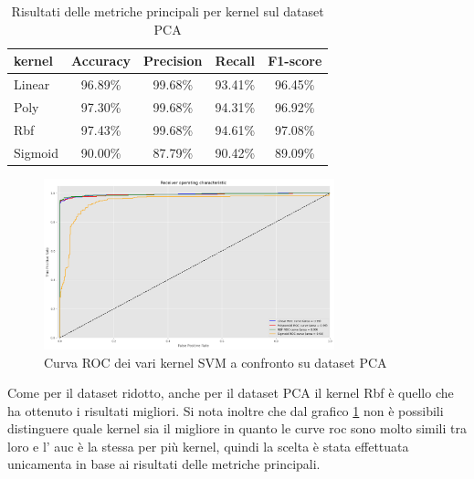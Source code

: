 \begin{table}[!ht]
    \centering
    \begin{tabular}{@{}lcccc@{}}
        \toprule
        \rowcolor[HTML]{EFEFEF}
        \textbf{kernel}                                                &
        \multicolumn{1}{l}{\cellcolor[HTML]{EFEFEF}\textbf{Accuracy}}  &
        \multicolumn{1}{l}{\cellcolor[HTML]{EFEFEF}\textbf{Precision}} &
        \multicolumn{1}{l}{\cellcolor[HTML]{EFEFEF}\textbf{Recall}}    &
        \multicolumn{1}{l}{\cellcolor[HTML]{EFEFEF}\textbf{F1-score}}                                          \\ \midrule
        Linear                                                         & 96.89\% & 99.68\% & 93.41\% & 96.45\% \\
        Poly                                                           & 97.30\% & 99.68\% & 94.31\% & 96.92\% \\
        Rbf                                                            & 97.43\% & 99.68\% & 94.61\% & 97.08\% \\
        Sigmoid                                                        & 90.00\% & 87.79\% & 90.42\% & 89.09\% \\ \bottomrule
    \end{tabular}
    \caption{Risultati delle metriche principali per kernel sul dataset PCA}
    \label{tab:top_metrics_kernels_pca}
\end{table}

\begin{figure}[!ht]
    \centering
    \includegraphics[width=0.75\textwidth]{img/svm/SVM_roc_pca.png}
    \caption{Curva ROC dei vari kernel SVM a confronto su dataset PCA}
    \label{fig:roc_SVM_PCA}
\end{figure}

Come per il dataset ridotto, anche per il dataset PCA il kernel Rbf
è quello che ha ottenuto i risultati migliori. Si nota inoltre che dal
grafico \ref{fig:roc_SVM_PCA} non è possibili distinguere quale kernel sia
il migliore in quanto le curve roc sono molto simili tra loro e l' auc è la
stessa per più kernel, quindi la scelta è stata effettuata unicamenta in base
ai risultati delle metriche principali.

